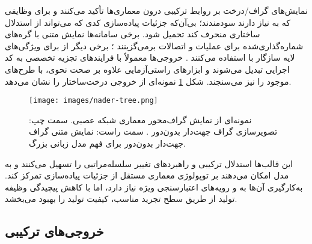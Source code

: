 نمایش‌های گراف/درخت بر روابط ترکیبی درون معماری‌ها تأکید می‌کنند و برای وظایفی که به  نیاز دارند سودمندند؛ بی‌آن‌که جزئیات پیاده‌سازی کدی که می‌تواند از استدلال ساختاری منحرف کند تحمیل شود. برخی سامانه‌ها نمایش متنی  با گره‌های شماره‌گذاری‌شده برای عملیات و اتصالات برمی‌گزینند \cite{Yang2025NADER}؛ برخی دیگر از  برای ویژگی‌های لایه سازگار با  استفاده می‌کنند \cite{Yu2025GPTNAS}. خروجی‌ها معمولاً با فرایندهای تجزیه تخصصی به کد اجرایی تبدیل می‌شوند و ابزارهای راستی‌آزمایی  علاوه بر صحت نحوی،  با طرح‌های موجود را نیز می‌سنجند. شکل \ref{fig:nader-tree} نمونه‌ای از خروجی درخت‌ساختار را نشان می‌دهد.
\begin{figure}[h!]
    \centering
    \texttt{[image: images/nader-tree.png]}
    \caption[نمونه ای از خروجی درخت ساختار]{
        نمونه‌ای از نمایش گراف‌محور معماری شبکه عصبی. سمت چپ: تصویرسازی گراف جهت‌دار بدون‌دور . سمت راست: نمایش متنی گراف جهت‌دار بدون‌دور برای فهم مدل زبانی بزرگ. \cite{Yang2025NADER}
    }
    \label{fig:nader-tree}
\end{figure}
این قالب‌ها استدلال ترکیبی و راهبردهای تغییر سلسله‌مراتبی را تسهیل می‌کنند و به مدل امکان می‌دهند بر توپولوژی معماری مستقل از جزئیات پیاده‌سازی تمرکز کند. به‌کارگیری آن‌ها به  و رویه‌های اعتبارسنجی ویژه نیاز دارد، اما با کاهش پیچیدگی وظیفه تولید از طریق سطح تجرید مناسب، کیفیت تولید را بهبود می‌بخشد.

\subsection{خروجی‌های ترکیبی}

